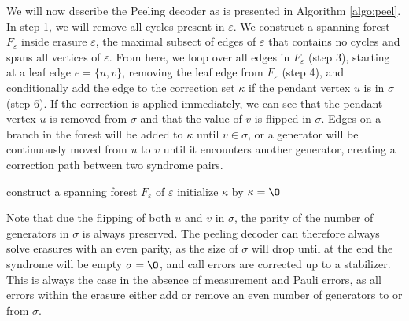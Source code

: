 


We will now describe the Peeling decoder as is presented in Algorithm \ref{algo:peel}. In step 1, we will remove all cycles present in $\varepsilon$. We construct a spanning forest $F_\varepsilon$ inside erasure $\varepsilon$, the maximal subsect of edges of $\varepsilon$ that contains no cycles and spans all vertices of $\varepsilon$. From here, we loop over all edges in $F_\varepsilon$ (step 3), starting at a leaf edge $e = \{u,v\}$, removing the leaf edge from $F_\varepsilon$ (step 4), and conditionally add the edge to the correction set $\kappa$ if the pendant vertex $u$ is in $\sigma$ (step 6). If the correction is applied immediately, we can see that the pendant vertex $u$ is removed from $\sigma$ and that the value of $v$ is flipped in $\sigma$. Edges on a branch in the forest will be added to $\kappa$ until $v \in \sigma$, or a generator will be continuously moved from $u$ to $v$ until it encounters another generator, creating a correction path between two syndrome pairs.

\begin{algo}[algotitle=Peeling decoder \cite{delfosse2017}, label=algo:peel]
\begin{algorithm}[H]
    \SetAlgoNoEnd
    \BlankLine
    construct a spanning forest $F_\varepsilon$ of $\varepsilon$\;
    initialize $\kappa$ by $\kappa = {\O}$\;
    \KwRet{$\kappa$}
\end{algorithm}
\end{algo}

\noindent Note that due the flipping of both $u$ and $v$ in $\sigma$, the parity of the number of generators in $\sigma$ is always preserved. The peeling decoder can therefore always solve erasures with an even parity, as the size of $\sigma$ will drop until at the end the syndrome will be empty $\sigma = \O$, and call errors are corrected up to a stabilizer. This is always the case in the absence of measurement and Pauli errors, as all errors within the erasure either add or remove an even number of generators to or from $\sigma$.

